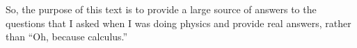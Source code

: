 \documentclass[a4paper, english, 12pt]{book}
\numberwithin{equation}{chapter}
\newlength{\chaptertopskip}
\newlength{\chapterbottomskip}
\begin{document}
        So, the purpose of this text is to provide a large source of answers to the questions that I asked when I was doing physics and provide real answers, rather than ``Oh, because calculus.''
    \fi
    \newpage
    
    \setlength{\parskip}{0.2em}

    
    \hypertarget{ToC}{}  %
    \tableofcontents
    \thispagestyle{noheader}
    \newpage



    
    \setlength{\parskip}{1em}
    

    \renewcommand{\thechapter}{\Roman{chapter}}%
    \renewcommand{\theHchapter}{\Roman{chapter}}

    \makeatletter
    \def\@makechapterhead#1{%
    \vspace*{\chaptertopskip}%
    {\parindent \z@ \raggedright \normalfont
        \ifnum \c@secnumdepth >\m@ne
        \if@mainmatter
            \huge\bfseries Pre-Module\space \thechapter:\
        \fi
        \fi
        \interlinepenalty\@M
        \Huge \bfseries #1\par\nobreak
        \vskip \chapterbottomskip
    }}
    \makeatother


    \mainmatter

    


    

    

    



    


    \renewcommand{\thechapter}{\arabic{chapter}}%
    \renewcommand{\theHchapter}{\arabic{chapter}}
\end{document}
